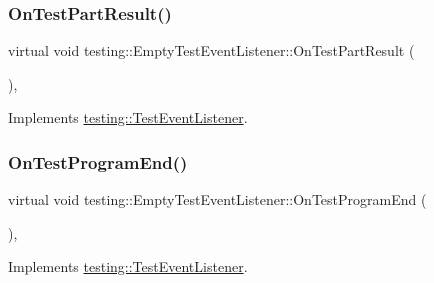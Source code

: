 \subsubsection{\texorpdfstring{OnTestPartResult()}{OnTestPartResult()}}
{\footnotesize\ttfamily virtual void testing\+::\+Empty\+Test\+Event\+Listener\+::\+On\+Test\+Part\+Result (\begin{DoxyParamCaption}\item[{const \mbox{\hyperlink{classtesting_1_1_test_part_result}{Test\+Part\+Result}} \&}]{ }\end{DoxyParamCaption})\hspace{0.3cm}{\ttfamily [inline]}, {\ttfamily [virtual]}}



Implements \mbox{\hyperlink{classtesting_1_1_test_event_listener_a054f8705c883fa120b91473aff38f2ee}{testing\+::\+Test\+Event\+Listener}}.

\mbox{\label{classtesting_1_1_empty_test_event_listener_a0abcc02bd2331a2e29ad6f4d9daf2a32}} 
\subsubsection{\texorpdfstring{OnTestProgramEnd()}{OnTestProgramEnd()}}
{\footnotesize\ttfamily virtual void testing\+::\+Empty\+Test\+Event\+Listener\+::\+On\+Test\+Program\+End (\begin{DoxyParamCaption}\item[{const \mbox{\hyperlink{classtesting_1_1_unit_test}{Unit\+Test}} \&}]{ }\end{DoxyParamCaption})\hspace{0.3cm}{\ttfamily [inline]}, {\ttfamily [virtual]}}



Implements \mbox{\hyperlink{classtesting_1_1_test_event_listener_ad15b6246d94c268e233487a86463ef3d}{testing\+::\+Test\+Event\+Listener}}.

\mbox{\label{classtesting_1_1_empty_test_event_listener_aa3847c8a3c22d8d69a6006dfdd6589fc}} 
